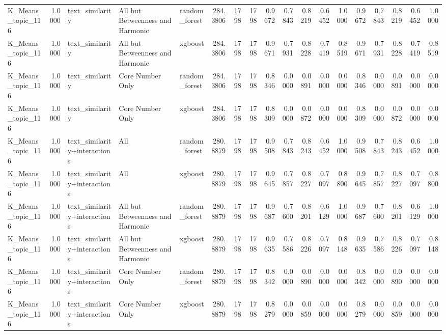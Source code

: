 \begin{tabular}{lrlllrrrrrrrrrrrrr}
K_Means_topic_116 & 1.0000 & text_similarity & All but Betweenness and Harmonic & random_forest & 284.3806 & 1798 & 1798 & 0.9672 & 0.7843 & 0.8219 & 0.6452 & 1.0000 & 0.9672 & 0.7843 & 0.8219 & 0.6452 & 1.0000 \\
K_Means_topic_116 & 1.0000 & text_similarity & All but Betweenness and Harmonic & xgboost & 284.3806 & 1798 & 1798 & 0.9671 & 0.7931 & 0.8228 & 0.7419 & 0.8519 & 0.9671 & 0.7931 & 0.8228 & 0.7419 & 0.8519 \\
K_Means_topic_116 & 1.0000 & text_similarity & Core Number Only & random_forest & 284.3806 & 1798 & 1798 & 0.8346 & 0.0000 & 0.0891 & 0.0000 & 0.0000 & 0.8346 & 0.0000 & 0.0891 & 0.0000 & 0.0000 \\
K_Means_topic_116 & 1.0000 & text_similarity & Core Number Only & xgboost & 284.3806 & 1798 & 1798 & 0.8309 & 0.0000 & 0.0872 & 0.0000 & 0.0000 & 0.8309 & 0.0000 & 0.0872 & 0.0000 & 0.0000 \\
K_Means_topic_116 & 1.0000 & text_similarity+interactions & All & random_forest & 280.8879 & 1798 & 1798 & 0.9508 & 0.7843 & 0.8243 & 0.6452 & 1.0000 & 0.9508 & 0.7843 & 0.8243 & 0.6452 & 1.0000 \\
K_Means_topic_116 & 1.0000 & text_similarity+interactions & All & xgboost & 280.8879 & 1798 & 1798 & 0.9645 & 0.7857 & 0.8227 & 0.7097 & 0.8800 & 0.9645 & 0.7857 & 0.8227 & 0.7097 & 0.8800 \\
K_Means_topic_116 & 1.0000 & text_similarity+interactions & All but Betweenness and Harmonic & random_forest & 280.8879 & 1798 & 1798 & 0.9687 & 0.7600 & 0.8201 & 0.6129 & 1.0000 & 0.9687 & 0.7600 & 0.8201 & 0.6129 & 1.0000 \\
K_Means_topic_116 & 1.0000 & text_similarity+interactions & All but Betweenness and Harmonic & xgboost & 280.8879 & 1798 & 1798 & 0.9635 & 0.7586 & 0.8226 & 0.7097 & 0.8148 & 0.9635 & 0.7586 & 0.8226 & 0.7097 & 0.8148 \\
K_Means_topic_116 & 1.0000 & text_similarity+interactions & Core Number Only & random_forest & 280.8879 & 1798 & 1798 & 0.8342 & 0.0000 & 0.0890 & 0.0000 & 0.0000 & 0.8342 & 0.0000 & 0.0890 & 0.0000 & 0.0000 \\
K_Means_topic_116 & 1.0000 & text_similarity+interactions & Core Number Only & xgboost & 280.8879 & 1798 & 1798 & 0.8279 & 0.0000 & 0.0859 & 0.0000 & 0.0000 & 0.8279 & 0.0000 & 0.0859 & 0.0000 & 0.0000 \\
\bottomrule
\end{tabular}
